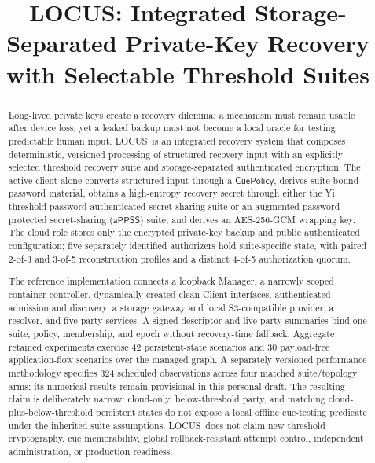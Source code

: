 \documentclass[sigconf,anonymous]{acmart}
\newcommand{\LOCUS}{\textsf{LOCUS}}
\newcommand{\APPSS}{\ensuremath{\mathsf{aPPSS}}}
\newcommand{\CuePolicy}{\ensuremath{\mathsf{CuePolicy}}}
\begin{document}
\title{LOCUS: Integrated Storage-Separated Private-Key Recovery with Selectable Threshold Suites}
\renewcommand{\shortauthors}{anonymous}

\begin{abstract}
Long-lived private keys create a recovery dilemma: a mechanism must remain
usable after device loss, yet a leaked backup must not become a local oracle
for testing predictable human input. \LOCUS\ is an integrated recovery system
that composes deterministic, versioned processing of structured recovery input
with an explicitly selected threshold recovery suite and storage-separated
authenticated encryption. The active client alone converts structured input
through a \CuePolicy, derives suite-bound password material, obtains a
high-entropy recovery secret through either the Yi threshold
password-authenticated secret-sharing suite or an augmented
password-protected secret-sharing (\APPSS) suite, and derives an AES-256-GCM
wrapping key. The cloud role stores only the encrypted private-key backup and
public authenticated configuration; five separately identified authorizers
hold suite-specific state, with paired 2-of-3 and 3-of-5 reconstruction
profiles and a distinct 4-of-5 authorization quorum.

The reference implementation connects a loopback Manager, a narrowly scoped
container controller, dynamically created clean Client interfaces,
authenticated admission and discovery, a storage gateway and local
S3-compatible provider, a resolver, and five party services. A signed
descriptor and live party summaries bind one suite, policy, membership, and
epoch without recovery-time fallback. Aggregate retained experiments exercise
42 persistent-state scenarios and 30 payload-free application-flow scenarios
over the managed graph. A separately versioned performance methodology
specifies 324 scheduled observations across four matched suite/topology arms;
its numerical results remain provisional in this personal draft. The resulting
claim is deliberately narrow: cloud-only, below-threshold party, and matching
cloud-plus-below-threshold persistent states do not expose a local offline
cue-testing predicate under the inherited suite assumptions. \LOCUS\ does not
claim new threshold cryptography, cue memorability, global rollback-resistant
attempt control, independent administration, or production readiness.
\end{abstract}

\end{document}
